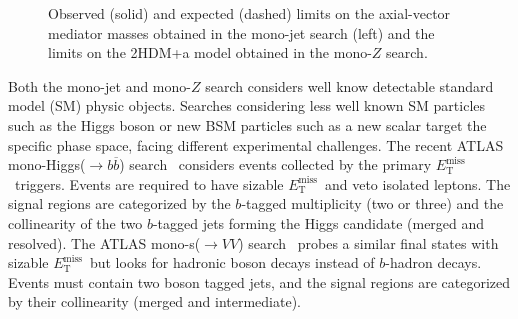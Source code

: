 \documentclass{moriond}
\def\et{E_\textrm{T}^{\textrm{miss}}}
\begin{document}
\begin{figure} [htb]
\begin{minipage}{0.45\linewidth}
\end{minipage}
\caption[]{Observed (solid) and expected (dashed) limits on the axial-vector mediator masses obtained in the mono-jet search (left) and the limits on the 2HDM+a model obtained in the mono-$Z$ search.}
\label{fig:mono_jet_z}
\end{figure}

Both the mono-jet and mono-$Z$ search considers well know detectable standard
model (SM) physic objects. Searches considering less well known SM particles
such as the Higgs boson or new BSM particles such as a new scalar target the
specific phase space, facing different experimental challenges. The recent
ATLAS mono-Higgs($\rightarrow b\overline{b}$) search~\cite{monoh} considers
events collected by the primary $\et$\ triggers. Events are required to have
sizable $\et$\ and veto isolated leptons. The signal regions are categorized by
the $b$-tagged multiplicity (two or three) and the collinearity of the two
$b$-tagged jets forming the Higgs candidate (merged and resolved). The ATLAS
mono-s($\rightarrow VV$) search~\cite{monos} probes a similar final states with
sizable $\et$\ but looks for hadronic boson decays instead of $b$-hadron
decays. Events must contain two boson tagged jets, and the signal regions are
categorized by their collinearity (merged and intermediate).    
\end{document}
